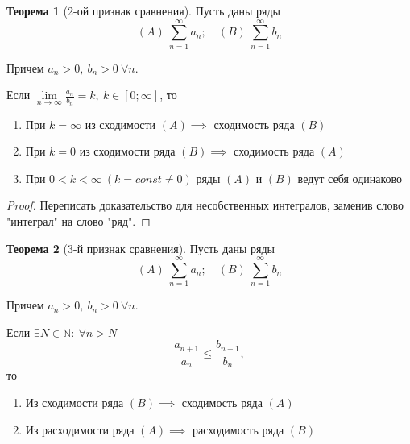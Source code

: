 \documentclass{report}
\theoremstyle{definition}
\newtheorem{theorem}{Теорема}[section]
\begin{document}
\begin{theorem}[2-ой признак сравнения]
  Пусть даны ряды
  \begin{equation*}
    (A) \ \sum_{n=1}^{\infty}a_n; \quad (B) \ \sum_{n=1}^{\infty}b_n
  \end{equation*}

  Причем $a_n > 0, \ b_n > 0 \ \forall n$.

  Если $\underset{n\rightarrow\infty}{\lim}\frac{a_n}{b_n}=k, \ k\in [0;\infty]$, то
  \begin{enumerate}
    \item При $k=\infty$ из сходимости $(A) \implies$ сходимость ряда $(B)$
    \item При $k=0$ из сходимости ряда $(B) \implies$ сходимость ряда $(A)$
    \item При $0<k<\infty \ (k = const \ne 0)$ ряды $(A)$ и $(B)$ ведут себя одинаково
  \end{enumerate}
\end{theorem}

\begin{proof}
  Переписать доказательство для несобственных интегралов, заменив слово "интеграл" на слово "ряд".
\end{proof}

\begin{theorem}[3-й признак сравнения]
  Пусть даны ряды
  \begin{equation*}
    (A) \ \sum_{n=1}^{\infty}a_n; \quad (B) \ \sum_{n=1}^{\infty}b_n
  \end{equation*}

  Причем $a_n > 0, \ b_n > 0 \ \forall n$.

  Если $\exists N \in \mathbb{N}: \ \forall n > N$
  \begin{equation*}
    \frac{a_{n+1}}{a_n}\leqslant\frac{b_{n+1}}{b_n},
  \end{equation*}
  то
  \begin{enumerate}
    \item Из сходимости ряда $(B) \implies$ сходимость ряда $(A)$
    \item Из расходимости ряда $(A) \implies$ расходимость ряда $(B)$
  \end{enumerate}
\end{theorem}
\end{document}
